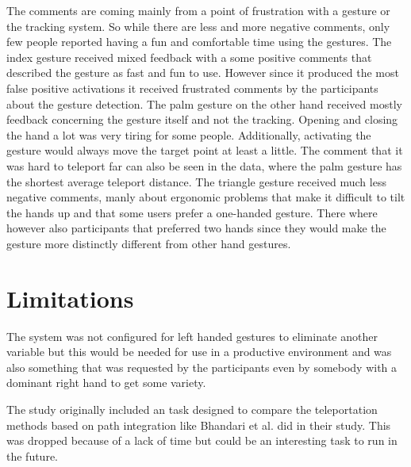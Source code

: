 The comments are coming mainly from a point of frustration with a gesture or the tracking system. So while there are less and more negative comments, only few people reported having a fun and comfortable time using the gestures. The index gesture received mixed feedback with a some positive comments that described the gesture as fast and fun to use. However since it produced the most false positive activations it received frustrated comments by the participants about the gesture detection. The palm gesture on the other hand received mostly feedback concerning the gesture itself and not the tracking. Opening and closing the hand a lot was very tiring for some people. Additionally, activating the gesture would always move the target point at least a little. The comment that it was hard to teleport far can also be seen in the data, where the palm gesture has the shortest average teleport distance. The triangle gesture received much less negative comments, manly about ergonomic problems that make it difficult to tilt the hands up and that some users prefer a one-handed gesture. There where however also participants that preferred two hands since they would make the gesture more distinctly different from other hand gestures. 


\section{Limitations}
The system was not configured for left handed gestures to eliminate another variable but this would be needed for use in a productive environment and was also something that was requested by the participants even by somebody with a dominant right hand to get some variety. 

The study originally included an task designed to compare the teleportation methods based on path integration like Bhandari et al. \cite{Bhandari} did in their study. This was dropped because of a lack of time but could be an interesting task to run in the future.
